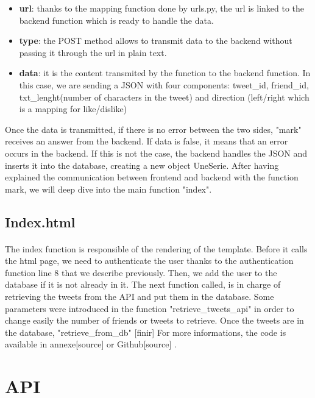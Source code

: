 \begin{itemize}
  \item \textbf{url}: thanks to the mapping function done by urls.py, the url is linked to the backend function which is ready to handle the data. 
  \item \textbf{type}: the POST method allows to transmit data to the backend without passing it through the url in plain text.
  \item \textbf{data}: it is the content transmited by the function to the backend function. In this case, we are sending a JSON with four components:  tweet\_id, friend\_id, txt\_lenght(number of characters in the tweet) and direction (left/right which is a mapping for like/dislike) 
\end{itemize}

Once the data is transmitted, if there is no error between the two sides, "mark" receives an answer from the backend. If data is false, it means that an error occurs in the backend. If this is not the case, the backend handles the JSON and inserts it into the database, creating a new object UneSerie. After having explained the communication between frontend and backend with the function mark, we will deep dive into the main function "index".

 \subsection{Index.html}
 
 

\paragraph{}
The index function is responsible of the rendering of the template. Before it calls the html page, we need to authenticate the user thanks to the authentication function line 8 that we describe previously. Then, we add the user to the database if it is not already in it. The next function called, is in charge of retrieving the tweets from the API and put them in the database. Some parameters were introduced in the function "retrieve\_tweets\_api" in order to change easily the number of friends or tweets to retrieve. Once the tweets are in the database, "retrieve\_from\_db" [finir]
For more informations, the code is available in annexe[source] or Github[source] .

 \section{API}
 
